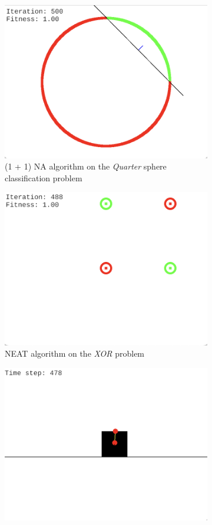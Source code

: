 \begin{figure}
    \centering
    \begin{subfigure}{0.5\textwidth}
        \centering
        \includegraphics[width=0.8\linewidth]{Pictures/oneplusonena_gui}
        \caption{(1 + 1) NA algorithm on the \textit{Quarter} sphere classification problem}
    \end{subfigure}%
    \hfill
    \begin{subfigure}{0.5\textwidth}
        \centering
        \includegraphics[width=0.8\linewidth]{Pictures/xor_gui}
        \caption{NEAT algorithm on the \textit{XOR} problem}
    \end{subfigure}%
    \hfill
    \begin{subfigure}{0.5\textwidth}
        \centering
        \includegraphics[width=0.8\linewidth]{Pictures/pole_balancing_gui}

\end{subfigure}
\end{figure}
